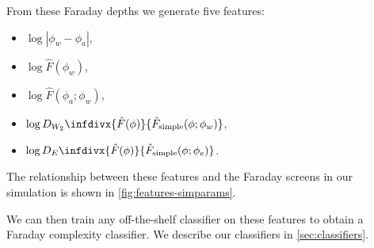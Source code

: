       From these Faraday depths we generate five features:
      \begin{itemize}
        \item $\log |\phi_w - \phi_a|$,
        \item $\log \hat F(\phi_w)$,
        \item $\log \hat F(\phi_a; \phi_w)$,
        \item $\log D_{W_2}\infdivx{\hat F(\phi)}{\hat F_{\mathrm{simple}}(\phi; \phi_w)}$,
        \item $\log D_{E}\infdivx{\hat F(\phi)}{\hat F_{\mathrm{simple}}(\phi; \phi_e)}$.
      \end{itemize}
      The relationship between these features and the Faraday screens in our simulation is shown in \autoref{fig:features-simparams}.

      We can then train any off-the-shelf classifier on these features to obtain a Faraday complexity classifier. We describe our classifiers in \autoref{sec:classifiers}.


  

